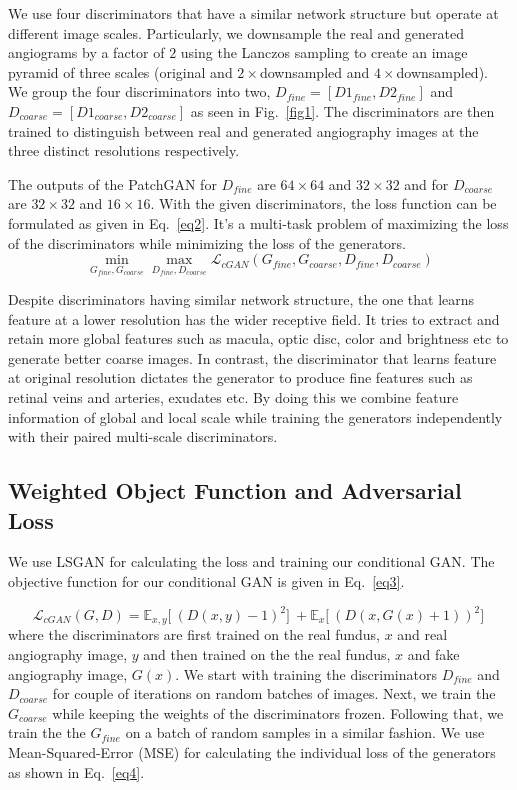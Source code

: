 \documentclass[runningheads]{llncs}
\begin{document}
We use four discriminators that have a similar network structure but operate at different image scales. Particularly, we downsample the real and generated angiograms by a factor of $2$ using the Lanczos sampling to create an image pyramid of three scales (original and $2\times$downsampled and $4\times$downsampled). We group the four discriminators into two, $D_{fine}=[D1_{fine},D2_{fine}]$ and $D_{coarse}=[D1_{coarse},D2_{coarse}]$ as seen in Fig.~\ref{fig1}. The discriminators are then trained to distinguish between real and generated angiography images at the three distinct resolutions respectively. 

The outputs of the PatchGAN for $D_{fine}$ are $64\times64$ and $32\times32$ and for $D_{coarse}$ are $32\times32$ and $16\times16$. With the given discriminators, the loss function can be formulated as given in Eq.~\ref{eq2}. It's a multi-task problem of maximizing the loss of the discriminators while minimizing the loss of the generators. 
\begin{equation}
    \min \limits_{G_{fine},G_{coarse}} \max \limits_{D_{fine},D_{coarse}}  \mathcal{L}_{cGAN}(G_{fine},G_{coarse}, D_{fine},D_{coarse})
    \label{eq2}
\end{equation}

Despite discriminators having similar network structure, the one that learns feature at a lower resolution has the wider receptive field.  It tries to extract and retain more global features such as macula, optic disc, color and brightness etc to generate better coarse images. In contrast,  the  discriminator that learns feature at original resolution dictates the generator to produce fine features such as retinal veins and arteries, exudates etc. By doing this we combine feature information of global and local scale while training the generators independently with their paired multi-scale discriminators.

\subsection{Weighted Object Function and Adversarial Loss}\label{subsec:objective}

We use LSGAN \cite{mao2017least} for calculating the loss and training our conditional GAN. The objective function for our conditional GAN is given in Eq.~\ref{eq3}. 

\begin{equation}
    \mathcal{L}_{cGAN}(G,D) =  \mathbb{E}_{x,y} \big[\ (D(x,y) -1)^2 \big]\ +  \mathbb{E}_{x} \big[\ (D(x,G(x)+1))^2 \big]\
\label{eq3}
\end{equation}
where the discriminators are first trained on the real fundus, $x$ and real angiography image, $y$ and then trained on the the real fundus, $x$ and fake angiography image, $G(x)$. We start with training the discriminators $D_{fine}$ and $D_{coarse}$ for couple of iterations on random batches of images. Next, we train the $G_{coarse}$ while keeping the weights of the discriminators frozen. Following that, we train the the $G_{fine}$ on a batch of random samples in a similar fashion. We use Mean-Squared-Error (MSE) for calculating the individual loss of the generators as shown in Eq.~\ref{eq4}.
\end{document}
